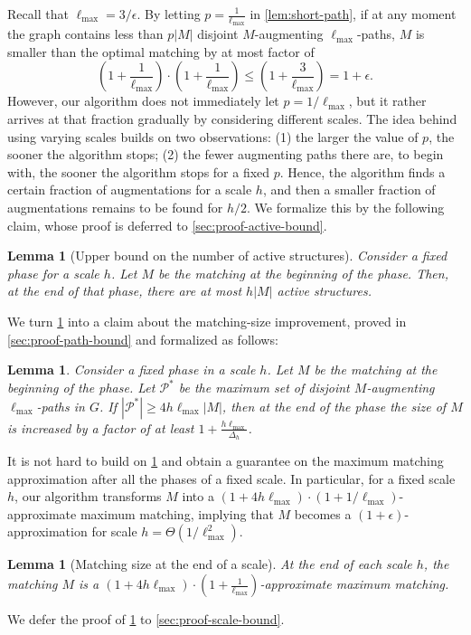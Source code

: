 \documentclass{article}
\newcommand{\eps}{\epsilon}
\newcommand{\lmax}{\ell_{\max}}
\newcommand{\calP}{\mathcal{P}}
\newtheorem{lemma}[theorem]{Lemma}
\newcommand{\rb}[1]{\left( #1 \right)}
\begin{document}
Recall that $\lmax = 3/\eps$.
By letting $p = \frac{1}{\lmax}$ in \cref{lem:short-path}, if at any moment the graph contains less than $p|M|$ disjoint $M$-augmenting $\lmax$-paths, $M$ is smaller than the optimal matching by at most factor of
\[
    \rb{1 + \frac{1}{\lmax}} \cdot \rb{1 + \frac{1}{\lmax}} \leq \rb{1 + \frac{3}{\lmax}} = 1 + \eps.
\]
However, our algorithm does not immediately let $p = 1/\lmax$, but it rather arrives at that fraction gradually by considering different scales. 
The idea behind using varying scales builds on two observations: (1) the larger the value of $p$, the sooner the algorithm stops; (2) the fewer augmenting paths there are, to begin with, the sooner the algorithm stops for a fixed $p$. 
Hence, the algorithm finds a certain fraction of augmentations for a scale $h$, and then a smaller fraction of augmentations remains to be found for $h/2$. We formalize this by the following claim, whose proof is deferred to \cref{sec:proof-active-bound}.
\begin{lemma}[Upper bound on the number of active structures] \label{lem:active-bound} 
Consider a fixed phase for a scale $h$. Let $M$ be the matching at the beginning of the phase. Then, at the end of that phase, there are at most $h|M|$ active structures.
\end{lemma}
We turn \cref{lem:active-bound} into a claim about the matching-size improvement, proved in \cref{sec:proof-path-bound} and formalized as follows:
\begin{lemma} \label{lem:path-bound} Consider a fixed phase in a scale $h$. Let $M$ be the matching at the beginning of the phase. Let $\calP^*$ be the maximum set of disjoint $M$-augmenting $\lmax$-paths in $G$. If $|\calP^*| \geq 4h\lmax |M|$, then at the end of the phase the size of $M$ is increased by a factor of at least $1 + \frac{h\lmax}{\Delta_h}$.
\end{lemma}
It is not hard to build on \cref{lem:path-bound} and obtain a guarantee on the maximum matching approximation after all the phases of a fixed scale.
In particular, for a fixed scale $h$, our algorithm transforms $M$ into a $\rb{1+4h\lmax} \cdot \rb{1+ 1 / \lmax}$-approximate maximum matching, implying that $M$ becomes a $(1 + \eps)$-approximation for scale $h = \Theta\rb{1 / \lmax^2}$.
\begin{lemma}[Matching size at the end of a scale]
\label{lem:scale-bound} At the end of each scale $h$, the matching $M$ is a $\rb{1 + 4h\lmax}\cdot \rb{1 + \frac{1}{\lmax}}$-approximate maximum matching.
\end{lemma}
We defer the proof of \cref{lem:scale-bound} to \cref{sec:proof-scale-bound}.
\end{document}
